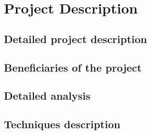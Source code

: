 \chapter{Project Description}
\section{Detailed project description}





\section{Beneficiaries of the project}





\section{Detailed analysis}




\section{Techniques description}


